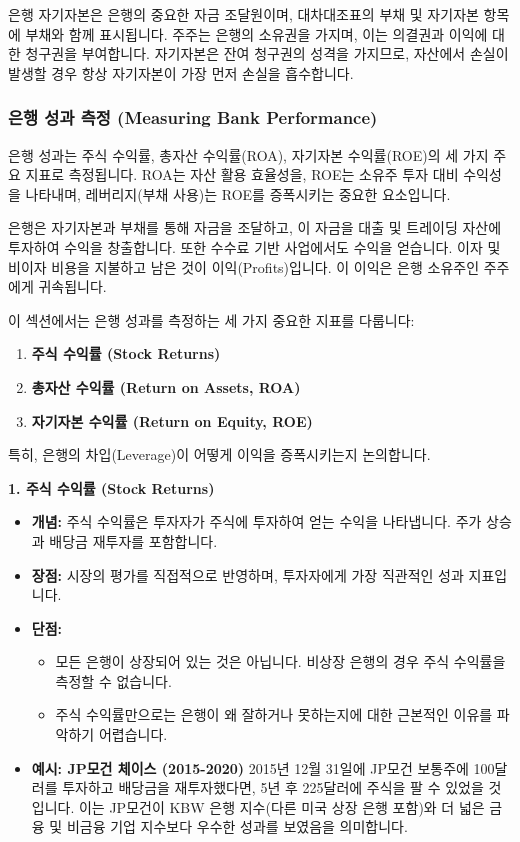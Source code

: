 \documentclass[11pt,a4paper]{article}
\theoremstyle{definition}
\begin{document}
\begin{summarybox}[title=\textbf{자기자본 요약}]
은행 자기자본은 은행의 중요한 자금 조달원이며, 대차대조표의 부채 및 자기자본 항목에 부채와 함께 표시됩니다. 주주는 은행의 소유권을 가지며, 이는 의결권과 이익에 대한 청구권을 부여합니다. 자기자본은 잔여 청구권의 성격을 가지므로, 자산에서 손실이 발생할 경우 항상 자기자본이 가장 먼저 손실을 흡수합니다.
\end{summarybox}

\newpage
\subsubsection{은행 성과 측정 (Measuring Bank Performance)}

\begin{infobox}[title=\textbf{핵심 요약: 은행 성과 측정}]
은행 성과는 주식 수익률, 총자산 수익률(ROA), 자기자본 수익률(ROE)의 세 가지 주요 지표로 측정됩니다. ROA는 자산 활용 효율성을, ROE는 소유주 투자 대비 수익성을 나타내며, 레버리지(부채 사용)는 ROE를 증폭시키는 중요한 요소입니다.
\end{infobox}

은행은 자기자본과 부채를 통해 자금을 조달하고, 이 자금을 대출 및 트레이딩 자산에 투자하여 수익을 창출합니다. 또한 수수료 기반 사업에서도 수익을 얻습니다. 이자 및 비이자 비용을 지불하고 남은 것이 이익(Profits)입니다. 이 이익은 은행 소유주인 주주에게 귀속됩니다.

이 섹션에서는 은행 성과를 측정하는 세 가지 중요한 지표를 다룹니다:
\begin{enumerate}
    \item \textbf{주식 수익률 (Stock Returns)}
    \item \textbf{총자산 수익률 (Return on Assets, ROA)}
    \item \textbf{자기자본 수익률 (Return on Equity, ROE)}
\end{enumerate}
특히, 은행의 차입(Leverage)이 어떻게 이익을 증폭시키는지 논의합니다.

\textbf{1. 주식 수익률 (Stock Returns)}
\begin{itemize}
    \item \textbf{개념:} 주식 수익률은 투자자가 주식에 투자하여 얻는 수익을 나타냅니다. 주가 상승과 배당금 재투자를 포함합니다.
    \item \textbf{장점:} 시장의 평가를 직접적으로 반영하며, 투자자에게 가장 직관적인 성과 지표입니다.
    \item \textbf{단점:}
        \begin{itemize}
            \item 모든 은행이 상장되어 있는 것은 아닙니다. 비상장 은행의 경우 주식 수익률을 측정할 수 없습니다.
            \item 주식 수익률만으로는 은행이 왜 잘하거나 못하는지에 대한 근본적인 이유를 파악하기 어렵습니다.
        \end{itemize}
    \item \textbf{예시: JP모건 체이스 (2015-2020)}
        2015년 12월 31일에 JP모건 보통주에 100달러를 투자하고 배당금을 재투자했다면, 5년 후 225달러에 주식을 팔 수 있었을 것입니다. 이는 JP모건이 KBW 은행 지수(다른 미국 상장 은행 포함)와 더 넓은 금융 및 비금융 기업 지수보다 우수한 성과를 보였음을 의미합니다.
\end{itemize}
\end{document}
